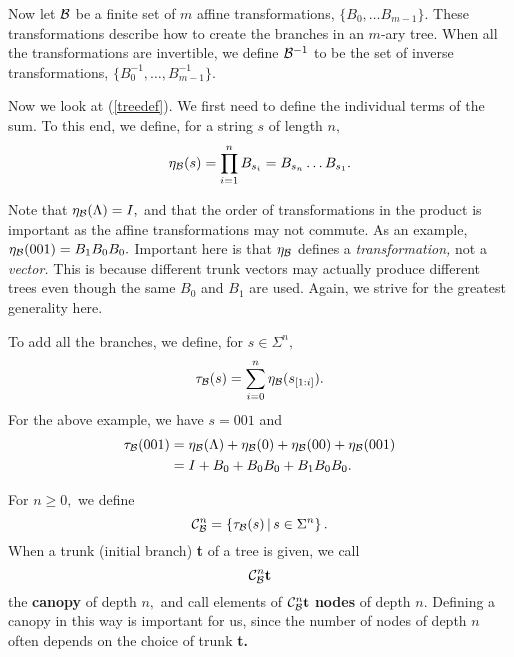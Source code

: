 \documentclass{article}
\def\es{\Lambda}
\begin{document}
Now let $\cal B$ be a finite set of $m$ affine transformations,  $\{B_0,\ldots B_{m-1}\}.$ These transformations describe how to create the branches in an $m$-ary tree. When all the transformations are invertible, we define ${\cal B}^{-1}$ to be the set of inverse transformations, $\{B_0^{-1},\ldots,B_{m-1}^{-1}\}.$

Now we look at (\ref{treedef}). We first need to define the individual terms of the sum.  To this end, we define, for a string $s$ of length $n,$
\begin{equation}
\eta_{\cal B}(s)=\prod_{i=1}^n B_{s_i} =B_{s_n}\ldots B_{s_1}.
\end{equation}

Note that $\eta_{\cal B}(\es)=I,$ and that the order of transformations in the product is important as the affine transformations may not commute. As an example, $\eta_{\cal B}(001)=B_1B_0B_0.$ Important here is that $\eta_{\cal B}$ defines a {\sl transformation,} not a {\sl vector.} This is because different trunk vectors may actually produce different trees even though the same $B_0$ and $B_1$ are used. Again, we strive for the greatest generality here.  

To add all the branches, we define, for $s\in\Sigma^n,$
\begin{equation}
\tau_{\cal B}(s)=\sum_{i=0}^{n} \eta_{\cal B}(s_{[1:i]}).
\end{equation}
For the above example, we have $s=001$ and
\begin{align*}
\tau_{\cal B}(001)&=\eta_{\cal B}(\Lambda)+\eta_{\cal B}(0)+\eta_{\cal B}(00)+\eta_{\cal B}(001)\\
&=I+B_0+B_0B_0+B_1B_0B_0.
\end{align*}

For $n\ge0,$ we define
\begin{equation}
{\cal C}^n_{\cal B}=\left\lbrace\tau_{\cal B}(s)\,|\,s\in\Sigma^n\right\rbrace.
\end{equation}
When a trunk (initial branch) {\bf t} of a tree is given, we call
\begin{equation}
{\cal C}_{\cal B}^n{\bf t}
\end{equation}
the {\bf canopy} of depth $n,$ and call elements of ${\cal C}_{\cal B}^n{\bf t}$ {\bf nodes} of depth $n.$ Defining a canopy in this way is important for us, since the number of nodes of depth $n$ often depends on the choice of trunk {\bf t.}
\end{document}
